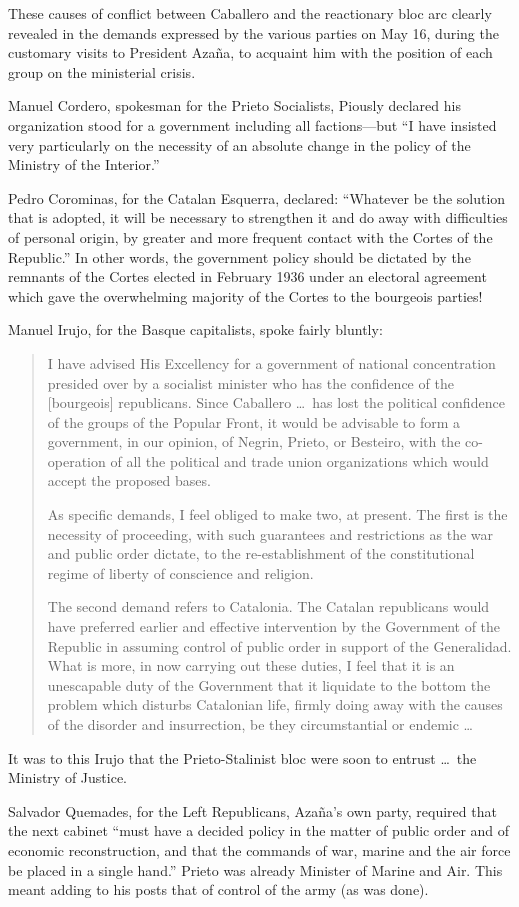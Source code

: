 \dinkus

These causes of conflict between Caballero and the reactionary bloc arc clearly revealed in the demands expressed by the various parties on May 16, during the customary visits to President Azaña, to acquaint him with the position of each group on the ministerial crisis.

Manuel Cordero, spokesman for the Prieto Socialists, Piously declared his organization stood for a government including all fac\-tions---but ``I have insisted very particularly on the necessity of an absolute change in the policy of the Ministry of the Interior.''

Pedro Corominas, for the Catalan Esquerra, declared: ``Whatever be the solution that is adopted, it will be necessary to strengthen it and do away with difficulties of personal origin, by greater and more frequent contact with the Cortes of the Republic.'' In other words, the government policy should be dictated by the remnants of the Cortes elected in February 1936 under an electoral agreement which gave the overwhelming majority of the Cortes to the bourgeois parties!

Manuel Irujo, for the Basque capitalists, spoke fairly bluntly:

\begin{quotation}
  I have advised His Excellency for a government of national concentration presided over by a socialist minister who has the confidence of the [bourgeois] republicans. Since Caballero \dots\ has lost the political confidence of the groups of the Popular Front, it would be advisable to form a government, in our opinion, of Negrin, Prieto, or Besteiro, with the co-operation of all the political and trade union organizations which would accept the proposed bases.
  
  As specific demands, I feel obliged to make two, at present. The first is the necessity of proceeding, with such guarantees and restrictions as the war and public order dictate, to the re-establishment of the constitutional regime of liberty of conscience and religion.
  
  The second demand refers to Catalonia. The Catalan republicans would have preferred earlier and effective intervention by the Government of the Republic in assuming control of public order in support of the Generalidad. What is more, in now carrying out these duties, I feel that it is an unescapable duty of the Government that it liquidate to the bottom the problem which disturbs Catalonian life, firmly doing away with the causes of the disorder and insurrection, be they circumstantial or endemic \dots
\end{quotation}

It was to this Irujo that the Prieto-Stalinist bloc were soon to entrust \dots\ the Ministry of Justice.

Salvador Quemades, for the Left Republicans, Azaña’s own party, required that the next cabinet ``must have a decided policy in the matter of public order and of economic reconstruction, and that the commands of war, marine and the air force be placed in a single hand.'' Prieto was already Minister of Marine and Air. This meant adding to his posts that of control of the army (as was done).